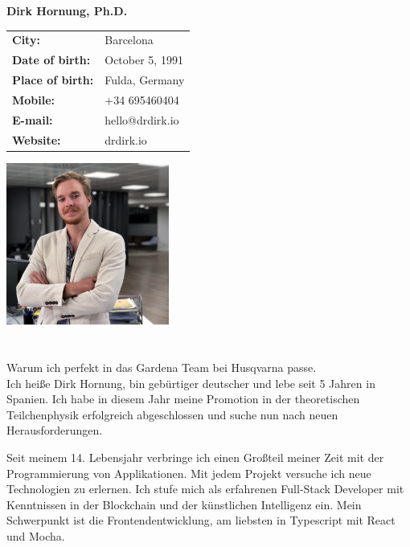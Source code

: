 \documentclass[11pt]{article}
\begin{document}
\Large
\noindent
\textbf{Dirk Hornung, Ph.D.} \\

\normalsize
\noindent
\begin{minipage}{0.5\linewidth}
  \begin{tabularx}{0.6\textwidth}{>{\bfseries}l l}
    City:           & Barcelona \\
    Date of birth:  & October 5, 1991\\
    Place of birth: & Fulda, Germany \\
    Mobile:         & +34 695460404 \\
    E-mail:         & hello@drdirk.io \\
    Website:      	& drdirk.io
  \end{tabularx}
\end{minipage}
\begin{minipage}{0.5\linewidth}
  \begin{flushright}
    \includegraphics[width=0.4\textwidth]{dirk.png}
  \end{flushright}
\end{minipage}

\section*{}
\vspace{0.5cm}
Warum ich perfekt in das Gardena Team bei Husqvarna passe. \\

\noindent Ich heiße Dirk Hornung, bin gebürtiger deutscher und lebe seit 5 Jahren in
Spanien. Ich habe in diesem Jahr meine Promotion in der theoretischen
Teilchenphysik erfolgreich abgeschlossen und suche nun nach neuen
Herausforderungen.

\noindent Seit meinem 14. Lebensjahr verbringe ich einen Großteil meiner Zeit mit der
Programmierung von Applikationen. Mit jedem Projekt versuche ich neue
Technologien zu erlernen. Ich stufe mich als erfahrenen Full-Stack
Developer mit Kenntnissen in der Blockchain und der künstlichen
Intelligenz ein. Mein Schwerpunkt ist die Frontendentwicklung, am
liebsten in Typescript mit React und Mocha.
\end{document}
